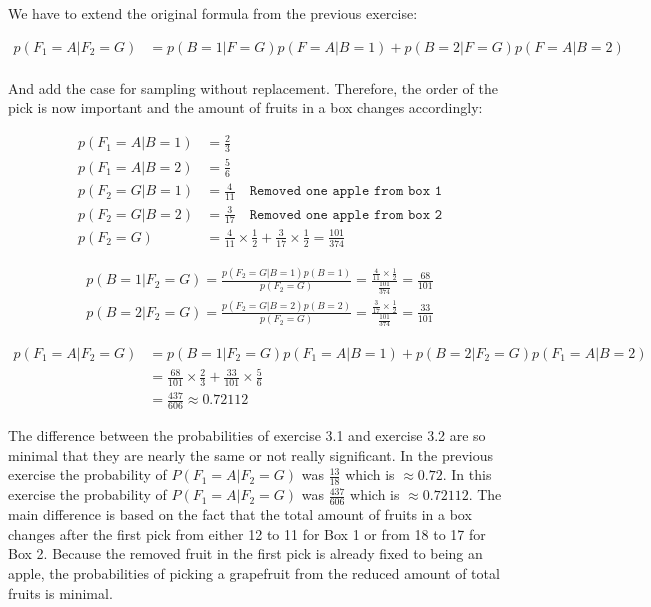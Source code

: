 \documentclass[a4paper]{article}
\begin{document}
We have to extend the original formula from the previous exercise:

\begin{align*}
	p(F_1 = A | F_2 = G) &= p(B = 1| F = G)p(F = A | B = 1) + p(B = 2 | F = G)p(F = A | B = 2)\\
\end{align*}

And add the case for sampling without replacement. Therefore, the order of the pick is now important and the amount of fruits in a box changes accordingly:

\begin{align*}
	p(F_1 = A | B = 1) &= \frac{2}{3}\\
	p(F_1 = A | B = 2) &= \frac{5}{6}\\
	p(F_2 = G | B = 1) &= \frac{4}{11}  \quad \texttt{Removed one apple from box 1}\\
	p(F_2 = G | B = 2) &= \frac{3}{17} \quad \texttt{Removed one apple from box 2}\\
		p(F_2 = G) &= \frac{4}{11} \times \frac{1}{2} + \frac{3}{17} \times \frac{1}{2} = \frac{101}{374}
\end{align*}

\begin{align*}
	p(B = 1 | F_2 = G) = \frac{p(F_2 = G | B = 1)p(B = 1)}{p(F_2 = G)} = \frac{\frac{4}{11} \times \frac{1}{2}}{\frac{101}{374}} = \frac{68}{101}\\
	p(B = 2 | F_2 = G) = \frac{p(F_2 = G | B = 2)p(B = 2)}{p(F_2 = G)} = \frac{\frac{3}{17} \times \frac{1}{2}}{\frac{101}{374}} = \frac{33}{101}
\end{align*}

\begin{align*}
	p(F_1 = A | F_2 = G) &=   p(B = 1| F_2 = G)p(F_1 = A | B = 1) + p(B = 2 | F_2 = G)p(F_1 = A | B = 2)\\
	&= \frac{68}{101} \times \frac{2}{3} + \frac{33}{101} \times \frac{5}{6}\\
	&= \frac{437}{606} \approx 0.72112
\end{align*}

The difference between the probabilities of exercise 3.1 and exercise 3.2 are so minimal that they are nearly the same or not really significant. In the previous exercise the probability of $P(F_1 = A | F_2 = G)$ was $\frac{13}{18}$ which is $\approx 0.72$. In this exercise the probability of $P(F_1 = A | F_2 = G)$ was $\frac{437}{606}$ which is $\approx 0.72112$. The main difference is based on the fact that the total amount of fruits in a box changes after the first pick from either 12 to 11 for Box 1 or from 18 to 17 for Box 2. Because the removed fruit in the first pick is already fixed to being an apple, the probabilities of picking a grapefruit from the reduced amount of total fruits is minimal.
\end{document}
